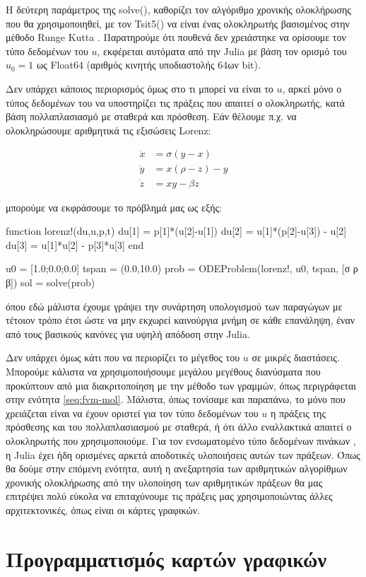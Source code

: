 Η δεύτερη παράμετρος της solve(), καθορίζει τον αλγόριθμο χρονικής ολοκλήρωσης που θα χρησιμοποιηθεί, με τον Tsit5() να είναι ένας ολοκληρωτής βασισμένος στην μέθοδο Runge Kutta \cite{Tsitouras2011}.
Παρατηρούμε ότι πουθενά δεν χρειάστηκε να ορίσουμε τον τύπο δεδομένων του $u$, εκφέρεται αυτόματα από την Julia με βάση τον ορισμό του $u_0 = 1$ ως Float64 (αριθμός κινητής υποδιαστολής 64ων bit).

Δεν υπάρχει κάποιος περιορισμός όμως στο τι μπορεί να είναι το $u$, αρκεί μόνο ο τύπος δεδομένων του να υποστηρίζει τις πράξεις που απαιτεί ο ολοκληρωτής, κατά βάση πολλαπλασιασμό με σταθερά και πρόσθεση.
Εάν θέλουμε π.χ. να ολοκληρώσουμε αριθμητικά τις εξισώσεις Lorenz:

\begin{align*}
    \dot{x} &= \sigma (y - x) \\
    \dot{y} &= x(\rho - z) - y \\
    \dot{z} &= x y - \beta z
\end{align*}

μπορούμε να εκφράσουμε το πρόβλημά μας ως εξής:

\begin{jllisting}[language=julia]
function lorenz!(du,u,p,t)
    du[1] = p[1]*(u[2]-u[1])
    du[2] = u[1]*(p[2]-u[3]) - u[2]
    du[3] = u[1]*u[2] - p[3]*u[3]
end

u0 = [1.0;0.0;0.0]
tspan = (0.0,10.0)
prob = ODEProblem(lorenz!, u0, tspan, [σ ρ β])
sol = solve(prob)
\end{jllisting}

όπου εδώ μάλιστα έχουμε γράψει την συνάρτηση υπολογισμού των παραγώγων με τέτοιον τρόπο έτσι ώστε να μην εκχωρεί καινούργια μνήμη σε κάθε επανάληψη, έναν από τους βασικούς κανόνες για υψηλή απόδοση στην Julia.

Δεν υπάρχει όμως κάτι που να περιορίζει το μέγεθος του $u$ σε μικρές διαστάσεις.
Μπορούμε κάλιστα να χρησιμοποιήσουμε μεγάλου μεγέθους διανύσματα που προκύπτουν από μια διακριτοποίηση με την μέθοδο των γραμμών, όπως περιγράφεται στην ενότητα \ref{seq:fvm-mol}.
Μάλιστα, όπως τονίσαμε και παραπάνω, το μόνο που χρειάζεται είναι να έχουν οριστεί για τον τύπο δεδομένων του $u$ η πράξεις της πρόσθεσης και του πολλαπλασιασμού με σταθερά, ή ότι άλλο εναλλακτικά απαιτεί ο ολοκληρωτής που χρησιμοποιούμε.
Για τον ενσωματομένο τύπο δεδομένων πινάκων , η Julia έχει ήδη ορισμένες αρκετά αποδοτικές υλοποιήσεις αυτών των πράξεων.
Όπως θα δούμε στην επόμενη ενότητα, αυτή η ανεξαρτησία των αριθμητικών αλγορίθμων χρονικής ολοκλήρωσης από την υλοποίηση των αριθμητικών πράξεων θα μας επιτρέψει πολύ εύκολα να επιταχύνουμε τις πράξεις μας χρησιμοποιώντας άλλες αρχιτεκτονικές, όπως είναι οι κάρτες γραφικών.

\section{Προγραμματισμός καρτών γραφικών}

